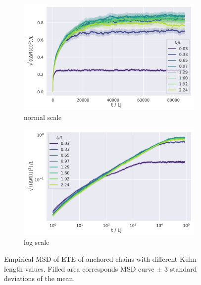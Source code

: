 \documentclass[
    paper=A4,pagesize=automedia,fontsize=12pt,
    BCOR=15mm,DIV=22,
    twoside,headinclude,footinclude=false,
    fleqn,             %
    bibliography=totocnumbered,          %
    listof=totoc,                %
    listof=flat,                 %
    cleardoublepage=empty      %
    numbers=endperiod
]{scrartcl}
\begin{document}
\begin{figure}
    \centering
    \begin{subfigure}[b]{\textwidth}
        \centering
        \includegraphics[width=\columnwidth,trim={0cm 0cm 0cm 0.0cm},clip]{4-exp-delta_R-bare.png}
        \caption{\label{fig:msd_anchored_l_K_normal}
        normal scale
        }
    \end{subfigure}
    \begin{subfigure}[b]{\textwidth}
        \centering
        \includegraphics[width=\columnwidth,trim={0cm 0cm 0cm 0.0cm},clip]{4-exp-delta_R-bare-log.png}
        \caption{\label{fig:msd_anchored_l_K_log}
        log scale
        }
    \end{subfigure}
    \caption{Empirical MSD of ETE of anchored chains with different Kuhn length values.
    Filled area corresponds MSD curve $\pm$ 3 standard deviations of the mean.}
    \label{fig:msd_anchored_l_K}
\end{figure}
\end{document}
